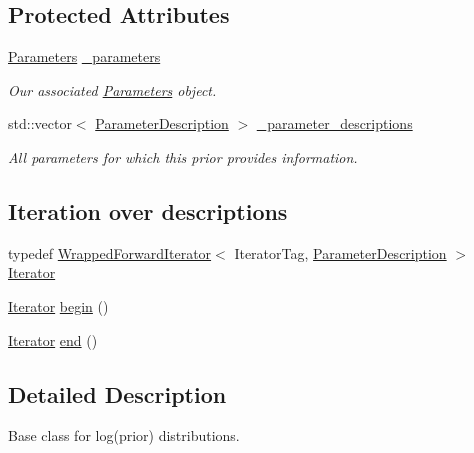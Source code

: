 \subsection*{Protected Attributes}
\begin{DoxyCompactItemize}
\item 
\hyperlink{classeos_1_1Parameters}{Parameters} \hyperlink{classeos_1_1LogPrior_a5b24d36e7d7d2f77d5a7d6533233f93b}{\_\-parameters}
\begin{DoxyCompactList}\small\item\em Our associated \hyperlink{classeos_1_1Parameters}{Parameters} object. \item\end{DoxyCompactList}\item 
std::vector$<$ \hyperlink{structeos_1_1ParameterDescription}{ParameterDescription} $>$ \hyperlink{classeos_1_1LogPrior_a2b9c6a50c9f4399e44973bad25b390be}{\_\-parameter\_\-descriptions}
\begin{DoxyCompactList}\small\item\em All parameters for which this prior provides information. \item\end{DoxyCompactList}\end{DoxyCompactItemize}
\subsection*{Iteration over descriptions}
\label{_amgrp2bd25b9507b5ca06b9e539835b3a1a12}
 \begin{DoxyCompactItemize}
\item 
typedef \hyperlink{classeos_1_1WrappedForwardIterator}{WrappedForwardIterator}$<$ IteratorTag, \hyperlink{structeos_1_1ParameterDescription}{ParameterDescription} $>$ \hyperlink{classeos_1_1LogPrior_a384dd9ec4424f2269e052e41ca834a3d}{Iterator}
\item 
\hyperlink{classeos_1_1WrappedForwardIterator}{Iterator} \hyperlink{classeos_1_1LogPrior_a50155394c200be97f25ef0e56973dbd8}{begin} ()
\item 
\hyperlink{classeos_1_1WrappedForwardIterator}{Iterator} \hyperlink{classeos_1_1LogPrior_a093e33ea2441515348249835a99781ba}{end} ()
\end{DoxyCompactItemize}


\subsection{Detailed Description}
Base class for log(prior) distributions.

